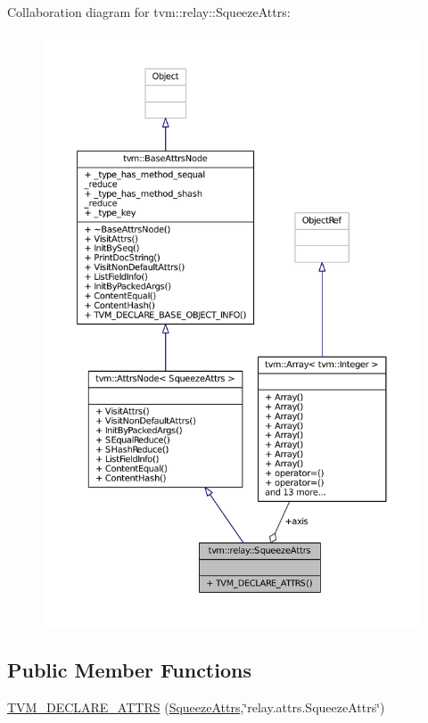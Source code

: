 Collaboration diagram for tvm\+:\+:relay\+:\+:Squeeze\+Attrs\+:
\nopagebreak
\begin{figure}[H]
\begin{center}
\leavevmode
\includegraphics[width=350pt]{structtvm_1_1relay_1_1SqueezeAttrs__coll__graph}
\end{center}
\end{figure}
\subsection*{Public Member Functions}
\begin{DoxyCompactItemize}
\item 
\hyperlink{structtvm_1_1relay_1_1SqueezeAttrs_ad683cfe14b5df05aa38a2a3824b5d882}{T\+V\+M\+\_\+\+D\+E\+C\+L\+A\+R\+E\+\_\+\+A\+T\+T\+RS} (\hyperlink{structtvm_1_1relay_1_1SqueezeAttrs}{Squeeze\+Attrs},\char`\"{}relay.\+attrs.\+Squeeze\+Attrs\char`\"{})
\end{DoxyCompactItemize}
